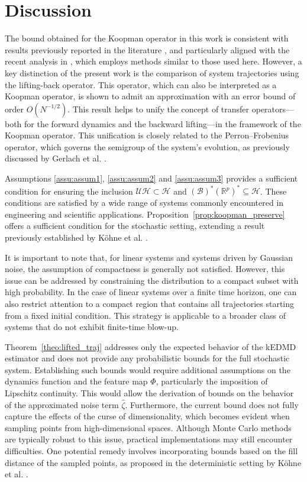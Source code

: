 \documentclass{article}
\begin{document}
\section{Discussion}
The bound obtained for the Koopman operator in this work is consistent with results previously reported in the literature \cite{Zhang2022APredictions, Bevanda2023KoopmanRegression, Kohne2025boldsymbolLboldsymbolinftyDecomposition}, and particularly aligned with the recent analysis in \cite{Philipp2024ErrorOperator}, which employs methods similar to those used here. However, a key distinction of the present work is the comparison of system trajectories using the lifting-back operator. This operator, which can also be interpreted as a Koopman operator, is shown to admit an approximation with an error bound of order $O(N^{-1/2})$. This result helps to unify the concept of transfer operators—both for the forward dynamics and the backward lifting—in the framework of the Koopman operator. This unification is closely related to the Perron–Frobenius operator, which governs the semigroup of the system's evolution, as previously discussed by Gerlach et al. \cite{Gerlach2020TheSystems}.

Assumptions \ref{assu:assum1}, \ref{assu:assum2} and \ref{assu:assum3} provides a sufficient condition for ensuring the inclusion $\mathcal{U}\mathcal{H} \subset \mathcal{H}$ and $(\mathcal{B})^*(\mathbb{R}^p)^* \subseteq \mathcal{H}$. These conditions are satisfied by a wide range of systems commonly encountered in engineering and scientific applications. Proposition~\ref{prop:koopman_preserve} offers a sufficient condition for the stochastic setting, extending a result previously established by Köhne et al. \cite{Kohne2025boldsymbolLboldsymbolinftyDecomposition}.

It is important to note that, for linear systems and systems driven by Gaussian noise, the assumption of compactness is generally not satisfied. However, this issue can be addressed by constraining the distribution to a compact subset with high probability. In the case of linear systems over a finite time horizon, one can also restrict attention to a compact region that contains all trajectories starting from a fixed initial condition. This strategy is applicable to a broader class of systems that do not exhibit finite-time blow-up.

Theorem~\ref{theo:lifted_traj} addresses only the expected behavior of the kEDMD estimator and does not provide any probabilistic bounds for the full stochastic system. Establishing such bounds would require additional assumptions on the dynamics function and the feature map $\Phi$, particularly the imposition of Lipschitz continuity. This would allow the derivation of bounds on the behavior of the approximated noise term $\hat{\zeta}$. Furthermore, the current bound does not fully capture the effects of the curse of dimensionality, which becomes evident when sampling points from high-dimensional spaces. Although Monte Carlo methods are typically robust to this issue, practical implementations may still encounter difficulties. One potential remedy involves incorporating bounds based on the fill distance of the sampled points, as proposed in the deterministic setting by Köhne et al. \cite{Kohne2025boldsymbolLboldsymbolinftyDecomposition}. 
\end{document}
